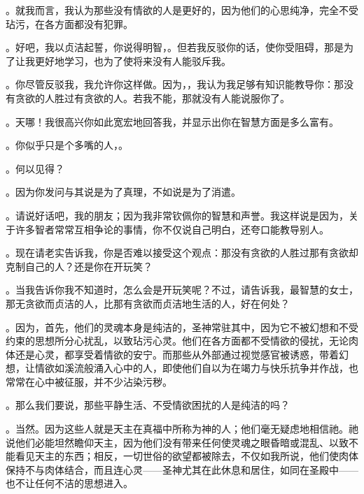 。就我而言，我认为那些没有情欲的人是更好的，因为他们的心思纯净，完全不受玷污，在各方面都没有犯罪。\par

。好吧，我以贞洁起誓，你说得明智，。但若我反驳你的话，使你受阻碍，那是为了让我更好地学习，也为了使将来没有人能驳斥我。\par

。你尽管反驳我，我允许你这样做。因为，，我认为我足够有知识能教导你：那没有贪欲的人胜过有贪欲的人。若我不能，那就没有人能说服你了。\par

。天哪！我很高兴你如此宽宏地回答我，并显示出你在智慧方面是多么富有。\par

。你似乎只是个多嘴的人，。\par

。何以见得？\par

。因为你发问与其说是为了真理，不如说是为了消遣。\par

。请说好话吧，我的朋友；因为我非常钦佩你的智慧和声誉。我这样说是因为，关于许多智者常常互相争论的事情，你不仅说自己明白，还夸口能教导别人。\par

。现在请老实告诉我，你是否难以接受这个观点：那没有贪欲的人胜过那有贪欲却克制自己的人？还是你在开玩笑？\par

。当我告诉你我不知道时，怎么会是开玩笑呢？不过，请告诉我，最智慧的女士，那无贪欲而贞洁的人，比那有贪欲而贞洁地生活的人，好在何处？\par

。因为，首先，他们的灵魂本身是纯洁的，圣神常驻其中，因为它不被幻想和不受约束的思想所分心扰乱，以致玷污心灵。他们在各方面都不受情欲的侵扰，无论肉体还是心灵，都享受着情欲的安宁。而那些从外部通过视觉感官被诱惑，带着幻想，让情欲如溪流般涌入心中的人，即使他们自以为在竭力与快乐抗争并作战，也常常在心中被征服，并不少沾染污秽。\par

。那么我们要说，那些平静生活、不受情欲困扰的人是纯洁的吗？\par

。当然。因为这些人就是天主在真福中所称为神的人；他们毫无疑虑地相信祂。祂说他们必能坦然瞻仰天主，因为他们没有带来任何使灵魂之眼昏暗或混乱、以致不能看见天主的东西；相反，一切世俗的欲望都被除去，不仅如我所说，他们使肉体保持不与肉体结合，而且连心灵——圣神尤其在此休息和居住，如同在圣殿中——也不让任何不洁的思想进入。\par

